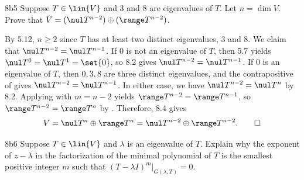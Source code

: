 \begin{exercise}{8b5}
    Suppose $T \in \lin{V}$ and $3$ and $8$ are eigenvalues of $T$.
    Let $n = \dim V$.
    Prove that $V = (\nul T^{n-2}) \oplus (\range T^{n-2})$.

\end{exercise}

\begin{sol}
    By 5.12, $n \geq 2$ since $T$ has at least two distinct eigenvalues, $3$ and $8$.
    We claim that $\nul T^{n-2} = \nul T^{n-1}$.
    If $0$ is not an eigenvalue of $T$, then 5.7 yields $\nul T^0 = \nul T^1 = \set{0}$, so 8.2 gives $\nul T^{n-2} = \nul T^{n-1}$.
    If $0$ is an eigenvalue of $T$, then $0, 3, 8$ are three distinct eigenvalues, and the contrapositive of  gives $\nul T^{n-2} = \nul T^{n-1}$.
    In either case, we have $\nul T^{n-2} = \nul T^n$ by 8.2.
    Applying  with $m=n-2$ yields $\range T^{n-2} = \range T^{n-1}$, so $\range T^{n-2} = \range T^n$ by .
    Therefore, 8.4 gives
    \[
        V = \nul T^n \oplus \range T^n = \nul T^{n-2} \oplus \range T^{n-2}. \qedhere
    \]
\end{sol}

\begin{exercise}{8b6}
    Suppose $T \in \lin{V}$ and $\lambda$ is an eigenvalue of $T$.
    Explain why the exponent of $z - \lambda$ in the factorization of the minimal polynomial of $T$ is the smallest positive integer $m$ such that $(T - \lambda I)^m|_{G(\lambda, T)} = 0$.
\end{exercise}

